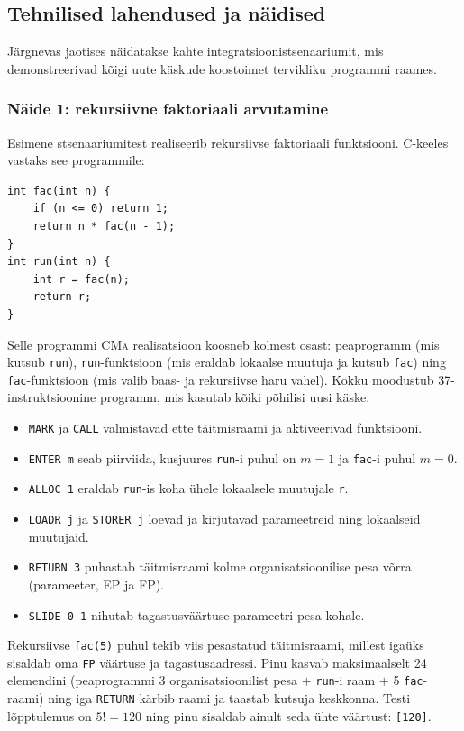 \subsection{Tehnilised lahendused ja näidised}\label{teostus:naidised}

Järgnevas jaotises näidatakse kahte integratsioonistsenaariumit, mis demonstreerivad kõigi uute käskude koostoimet tervikliku programmi raames.

\subsubsection{Näide 1: rekursiivne faktoriaali arvutamine}

Esimene stsenaariumitest realiseerib rekursiivse faktoriaali funktsiooni. C-keeles vastaks see programmile:

\begin{verbatim}
int fac(int n) {
    if (n <= 0) return 1;
    return n * fac(n - 1);
}
int run(int n) {
    int r = fac(n);
    return r;
}
\end{verbatim}

Selle programmi \textsc{CMa} realisatsioon koosneb kolmest osast: peaprogramm (mis kutsub \texttt{run}), \texttt{run}-funktsioon (mis eraldab lokaalse muutuja ja kutsub \texttt{fac}) ning \texttt{fac}-funktsioon (mis valib baas- ja rekursiivse haru vahel). Kokku moodustub 37-instruktsioonine programm, mis kasutab kõiki põhilisi uusi käske.

\begin{itemize}
	\item \texttt{MARK} ja \texttt{CALL} valmistavad ette täitmisraami ja aktiveerivad funktsiooni.
	\item \texttt{ENTER m} seab piirviida, kusjuures \texttt{run}-i puhul on $m = 1$ ja \texttt{fac}-i puhul $m = 0$.
	\item \texttt{ALLOC 1} eraldab \texttt{run}-is koha ühele lokaalsele muutujale \texttt{r}.
	\item \texttt{LOADR j} ja \texttt{STORER j} loevad ja kirjutavad parameetreid ning lokaalseid muutujaid.
	\item \texttt{RETURN 3} puhastab täitmisraami kolme organisatsioonilise pesa võrra (parameeter, EP ja FP).
	\item \texttt{SLIDE 0 1} nihutab tagastusväärtuse parameetri pesa kohale.
\end{itemize}

Rekursiivse \texttt{fac(5)} puhul tekib viis pesastatud täitmisraami, millest igaüks sisaldab oma \texttt{FP} väärtuse ja tagastusaadressi. Pinu kasvab maksimaalselt 24 elemendini (peaprogrammi 3 organisatsioonilist pesa $+$ \texttt{run}-i raam $+$ 5 \texttt{fac}-raami) ning iga \texttt{RETURN} kärbib raami ja taastab kutsuja keskkonna. Testi lõpptulemus on $5! = 120$ ning pinu sisaldab ainult seda ühte väärtust: \texttt{[120]}.

